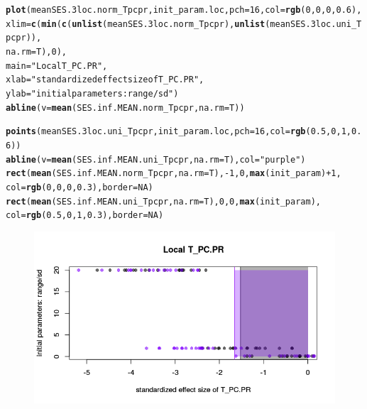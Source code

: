 \documentclass[12pt]{article}\usepackage[]{graphicx}\usepackage[]{color}
\makeatletter
\def\maxwidth{ %
  \ifdim\Gin@nat@width>\linewidth
    \linewidth
  \else
    \Gin@nat@width
  \fi
}
\newcommand{\hlnum}[1]{\textcolor[rgb]{0.686,0.059,0.569}{#1}}%
\newcommand{\hlstr}[1]{\textcolor[rgb]{0.192,0.494,0.8}{#1}}%
\newcommand{\hlopt}[1]{\textcolor[rgb]{0,0,0}{#1}}%
\newcommand{\hlstd}[1]{\textcolor[rgb]{0.345,0.345,0.345}{#1}}%
\newcommand{\hlkwc}[1]{\textcolor[rgb]{0.333,0.667,0.333}{#1}}%
\newcommand{\hlkwd}[1]{\textcolor[rgb]{0.737,0.353,0.396}{\textbf{#1}}}%
\newenvironment{kframe}{%
 \def\at@end@of@kframe{}%
 \ifinner\ifhmode%
  \def\at@end@of@kframe{\end{minipage}}%
  \begin{minipage}{\columnwidth}%
 \fi\fi%
 \def\FrameCommand##1{\hskip\@totalleftmargin \hskip-\fboxsep
 \colorbox{shadecolor}{##1}\hskip-\fboxsep
     \hskip-\linewidth \hskip-\@totalleftmargin \hskip\columnwidth}%
 \MakeFramed {\advance\hsize-\width
   \@totalleftmargin\z@ \linewidth\hsize
   \@setminipage}}%
 {\par\unskip\endMakeFramed%
 \at@end@of@kframe}
\newenvironment{knitrout}{}{} %
\makeatother
\begin{document}
  
\begin{knitrout}\small
{}\color{fgcolor}\begin{kframe}
\begin{alltt}
\hlkwd{plot}\hlstd{(meanSES.3loc.norm_Tpcpr, init_param.loc,} \hlkwc{pch} \hlstd{=} \hlnum{16}\hlstd{,} \hlkwc{col} \hlstd{=} \hlkwd{rgb}\hlstd{(}\hlnum{0}\hlstd{,} \hlnum{0}\hlstd{,} \hlnum{0}\hlstd{,} \hlnum{0.6}\hlstd{),}
     \hlkwc{xlim} \hlstd{=} \hlkwd{c}\hlstd{(}\hlkwd{min}\hlstd{(}\hlkwd{c}\hlstd{(}\hlkwd{unlist}\hlstd{(meanSES.3loc.norm_Tpcpr),} \hlkwd{unlist}\hlstd{(meanSES.3loc.uni_Tpcpr)),}
     \hlkwc{na.rm} \hlstd{= T),} \hlnum{0}\hlstd{),}
     \hlkwc{main} \hlstd{=} \hlstr{"Local T_PC.PR"}\hlstd{,}
     \hlkwc{xlab} \hlstd{=} \hlstr{"standardized effect size of T_PC.PR"}\hlstd{,}
     \hlkwc{ylab} \hlstd{=} \hlstr{"initial parameters: range/sd"}\hlstd{)}
\hlkwd{abline}\hlstd{(}\hlkwc{v} \hlstd{=} \hlkwd{mean}\hlstd{(SES.inf.MEAN.norm_Tpcpr,} \hlkwc{na.rm} \hlstd{= T))}

\hlkwd{points}\hlstd{(meanSES.3loc.uni_Tpcpr, init_param.loc,} \hlkwc{pch} \hlstd{=} \hlnum{16}\hlstd{,} \hlkwc{col} \hlstd{=} \hlkwd{rgb}\hlstd{(}\hlnum{0.5}\hlstd{,} \hlnum{0}\hlstd{,} \hlnum{1}\hlstd{,} \hlnum{0.6}\hlstd{))}
\hlkwd{abline}\hlstd{(}\hlkwc{v} \hlstd{=} \hlkwd{mean}\hlstd{(SES.inf.MEAN.uni_Tpcpr,} \hlkwc{na.rm} \hlstd{= T),} \hlkwc{col} \hlstd{=} \hlstr{"purple"}\hlstd{)}
\hlkwd{rect}\hlstd{(}\hlkwd{mean}\hlstd{(SES.inf.MEAN.norm_Tpcpr,} \hlkwc{na.rm} \hlstd{= T),} \hlopt{-}\hlnum{1}\hlstd{,} \hlnum{0}\hlstd{,} \hlkwd{max}\hlstd{(init_param)} \hlopt{+} \hlnum{1}\hlstd{,}
     \hlkwc{col} \hlstd{=} \hlkwd{rgb}\hlstd{(}\hlnum{0}\hlstd{,} \hlnum{0}\hlstd{,} \hlnum{0}\hlstd{,} \hlnum{0.3}\hlstd{),} \hlkwc{border} \hlstd{=} \hlnum{NA}\hlstd{)}
\hlkwd{rect}\hlstd{(}\hlkwd{mean}\hlstd{(SES.inf.MEAN.uni_Tpcpr,} \hlkwc{na.rm} \hlstd{= T),} \hlnum{0}\hlstd{,} \hlnum{0}\hlstd{,} \hlkwd{max}\hlstd{(init_param),}
     \hlkwc{col} \hlstd{=} \hlkwd{rgb}\hlstd{(}\hlnum{0.5}\hlstd{,} \hlnum{0}\hlstd{,} \hlnum{1}\hlstd{,} \hlnum{0.3}\hlstd{),} \hlkwc{border} \hlstd{=} \hlnum{NA}\hlstd{)}
\end{alltt}
\end{kframe}\begin{figure}

{\centering \includegraphics[width=\maxwidth]{figure/Ex_filter_results_plot_initparam2-1} 

}
\end{figure}
\end{knitrout}
\end{document}
